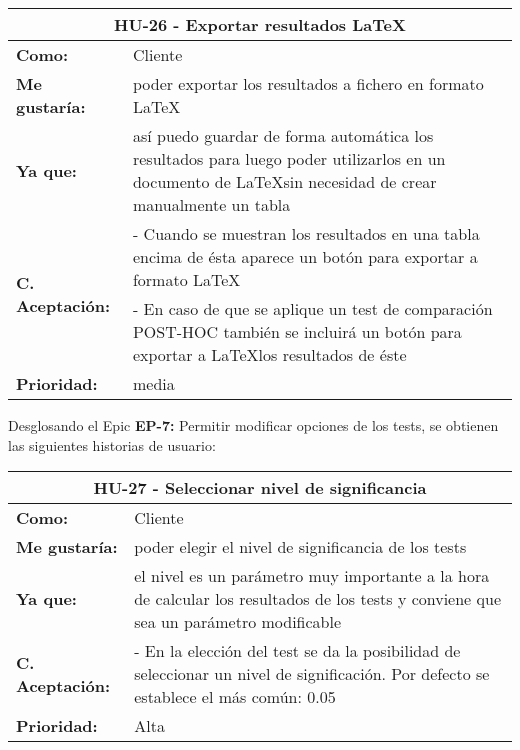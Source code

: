 
\begin{table}[H]
	\begin{tabular}{| p{3cm}| p{12cm} |}
		\hline
		\multicolumn{2}{|c|}{\textbf{HU-26} - Exportar resultados \LaTeX} \\ \hline
		\textbf{Como:} & Cliente \\ \hline
		\textbf{Me gustaría:} & poder exportar los resultados a fichero en formato \LaTeX \\ \hline
		\textbf{Ya que:} & así puedo guardar de forma automática los resultados para luego poder utilizarlos en un documento de \LaTeX sin necesidad de crear manualmente un tabla \\ \hline
		\multirow{2}{12cm}{\textbf{C. Aceptación:}} & - Cuando se muestran los resultados en una tabla encima de ésta aparece un botón para exportar a formato \LaTeX \\
		& - En caso de que se aplique un test de comparación POST-HOC también se incluirá un botón para exportar a \LaTeX los resultados de éste \\ \hline
		\textbf{\textbf{Prioridad:}} & media \\ \hline
	\end{tabular}
\end{table}


Desglosando el Epic \textbf{EP-7:} Permitir modificar opciones de los tests, se obtienen las siguientes historias de usuario:

\begin{table}[H]
	\begin{tabular}{| p{3cm}| p{12cm} |}
		\hline
		\multicolumn{2}{|c|}{\textbf{HU-27} - Seleccionar nivel de significancia} \\ \hline
		\textbf{Como:} & Cliente \\ \hline
		\textbf{Me gustaría:} & poder elegir el nivel de significancia de los tests \\ \hline
		\textbf{Ya que:} & el nivel es un parámetro muy importante a la hora de calcular los resultados de los tests y conviene que sea un parámetro modificable \\ \hline
		\textbf{C. Aceptación:} & - En la elección del test se da la posibilidad de seleccionar un nivel de significación. Por defecto se establece el más común: 0.05  \\ \hline
		\textbf{\textbf{Prioridad:}} & Alta \\ \hline
	\end{tabular}
\end{table}

